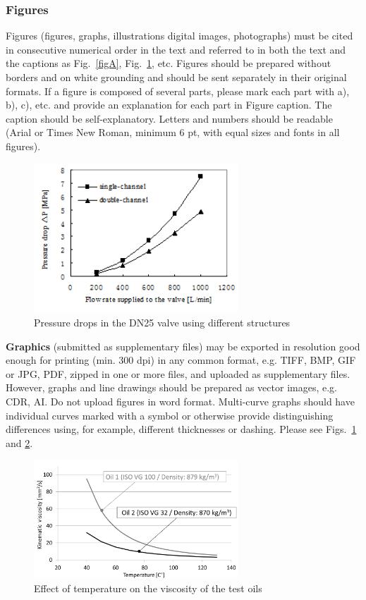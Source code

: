 \documentclass[10pt]{JoME}
\begin{document}
\subsubsection{Figures}
Figures (figures, graphs, illustrations digital images, photographs) must be cited in consecutive numerical order in the text and referred to in both the text and the captions as Fig.~\ref{figA}, Fig.~\ref{figB}, etc. Figures should be prepared without borders and on white grounding and should be sent separately in their original formats. If a figure is composed of several parts, please mark each part with a), b), c), etc. and provide an explanation for each part in Figure caption. The caption should be self-explanatory. Letters and numbers should be readable (Arial or Times New Roman, minimum 6 pt, with equal sizes and fonts in all figures).

\begin{figure}[h]
\includegraphics[width=76.5mm]{fig2.png}
\caption{Pressure drops in the DN25 valve using different structures\label{figB}}
\end{figure}
 
 
\textbf{Graphics} (submitted as supplementary files) may be exported in resolution good enough for printing (min. 300 dpi) in any common format, e.g. TIFF, BMP, GIF or JPG, PDF, zipped in one or more files, and uploaded as supplementary files. However, graphs and line drawings should be prepared as vector images, e.g. CDR, AI. Do not upload figures in word format.
Multi-curve graphs should have individual curves marked with a symbol or otherwise provide distinguishing differences using, for example, different thicknesses or dashing. Please see Figs.~\ref{figB} and \ref{figC}.

  
\begin{figure}[h]
\includegraphics[width=76.5mm]{fig3.png}
\caption{Effect of temperature on the viscosity of the test oils\label{figC}}
\end{figure}
 
\end{document}

